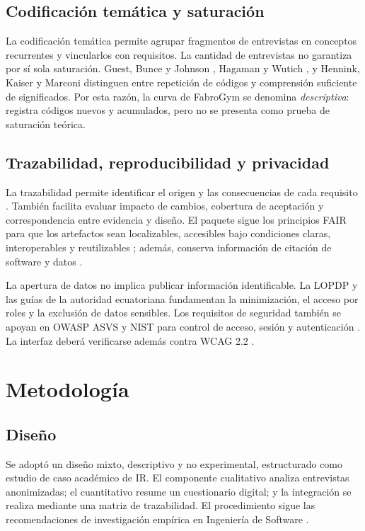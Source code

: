 \documentclass[11pt,a4paper]{article}
\begin{document}
\subsection{Codificación temática y saturación}

La codificación temática permite agrupar fragmentos de entrevistas en conceptos recurrentes y vincularlos con requisitos. La cantidad de entrevistas no garantiza por sí sola saturación. Guest, Bunce y Johnson \cite{guest2006}, Hagaman y Wutich \cite{hagaman2017}, y Hennink, Kaiser y Marconi \cite{hennink2017} distinguen entre repetición de códigos y comprensión suficiente de significados. Por esta razón, la curva de FabroGym se denomina \emph{descriptiva}: registra códigos nuevos y acumulados, pero no se presenta como prueba de saturación teórica.

\subsection{Trazabilidad, reproducibilidad y privacidad}

La trazabilidad permite identificar el origen y las consecuencias de cada requisito \cite{iso29148}. También facilita evaluar impacto de cambios, cobertura de aceptación y correspondencia entre evidencia y diseño. El paquete sigue los principios FAIR para que los artefactos sean localizables, accesibles bajo condiciones claras, interoperables y reutilizables \cite{wilkinson2016}; además, conserva información de citación de software y datos \cite{smith2016}.

La apertura de datos no implica publicar información identificable. La LOPDP \cite{lopdp2021} y las guías de la autoridad ecuatoriana \cite{spdp2025,spdp2026} fundamentan la minimización, el acceso por roles y la exclusión de datos sensibles. Los requisitos de seguridad también se apoyan en OWASP ASVS y NIST para control de acceso, sesión y autenticación \cite{owasp2025,nist2025}. La interfaz deberá verificarse además contra WCAG 2.2 \cite{wcag2024}.

\section{Metodología}

\subsection{Diseño}

Se adoptó un diseño mixto, descriptivo y no experimental, estructurado como estudio de caso académico de IR. El componente cualitativo analiza entrevistas anonimizadas; el cuantitativo resume un cuestionario digital; y la integración se realiza mediante una matriz de trazabilidad. El procedimiento sigue las recomendaciones de investigación empírica en Ingeniería de Software \cite{runeson2009,wohlin2012}.
\end{document}
